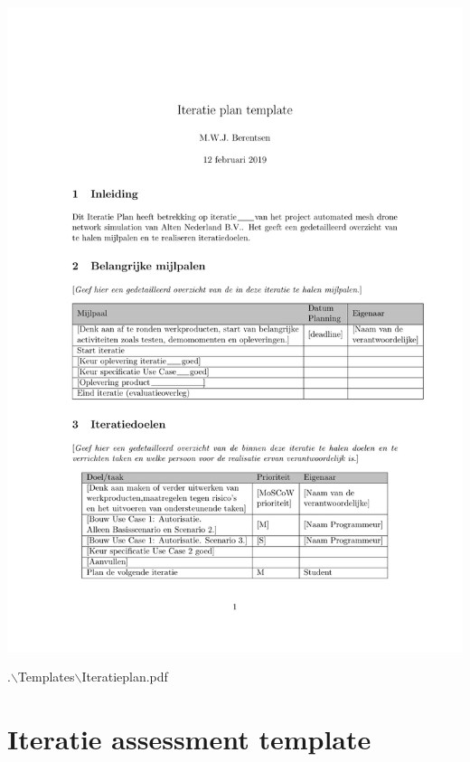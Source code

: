 \documentclass[a4paper, 11pt, oneside]{report}
\begin{document}
\begin{center}\includegraphics[page=1,width=.8\linewidth]{Templates/Iteratieplan/Iteratieplan.pdf}\end{center}
.$\backslash$Templates$\backslash$Iteratieplan.pdf

\chapter{Iteratie assessment template}
\label{app:assesement}
\end{document}
